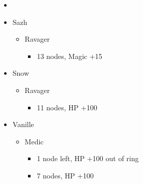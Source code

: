 	\begin{menu}
		\begin{itemize}
			\paradigm
			\begin{itemize}
				\item {}%
				      {}%
				      {\paradigmline{\com}{\rav}{(\med)}}%
				      {\paradigmline{\rav}{(\rav)}{\rav}}%
				      {\paradigmline{\com}{\com}{(\med)}}%
				      {\paradigmline[5]{\textit{\rav}}{\textit{(\rav)}}{\textit{\sab}}}%
				      {\paradigmline{\com}{\com}{\rav}}
			\end{itemize}
			\crystarium
			\begin{itemize}
				\item Sazh
				      \begin{itemize}
					      \item Ravager
					            \begin{itemize}
						            \item 13 nodes, Magic +15
					            \end{itemize}
				      \end{itemize}
				\item Snow
				      \begin{itemize}
					      \item Ravager
					            \begin{itemize}
						            \item 11 nodes, HP +100
					            \end{itemize}
				      \end{itemize}
				\item Vanille
				      \begin{itemize}
					      \item Medic
					            \begin{itemize}
						            \item 1 node left, HP +100 out of ring
						            \item 7 nodes, HP +100
					            \end{itemize}
				      \end{itemize}
			\end{itemize}
		\end{itemize}
	\end{menu}


